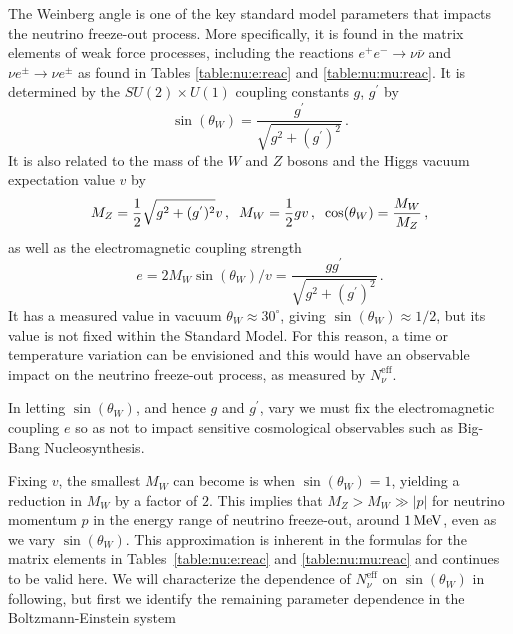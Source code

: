 The Weinberg angle is one of the key standard model parameters that impacts the neutrino freeze-out process. More specifically, it is found in the matrix elements of weak force processes, including the reactions $e^+e^-\rightarrow \nu\bar\nu$ and $\nu e^\pm\rightarrow \nu e^\pm$ as found in Tables \ref{table:nu:e:reac} and \ref{table:nu:mu:reac}. It is determined by the $SU(2)\times U(1)$ coupling constants $g$, $g^{'}$ by
\begin{equation}
\sin(\theta_W)=\frac{g^{'}}{\sqrt{g^2+(g^{'})^2}}\,.
\end{equation}
It is also related to the mass of the $W$ and $Z$ bosons and the Higgs vacuum expectation value $v$ by
\begin{equation}
M_Z=\frac{1}{2}\sqrt{g^2+(g^{'})^2}v\,,\hspace{2mm} M_W=\frac{1}{2}gv\,,\hspace{2mm} \cos(\theta_W)=\frac{M_W}{M_Z}\,,
\end{equation}
as well as the electromagnetic coupling strength
\begin{equation}
e=2M_W\sin(\theta_W)/v=\frac{gg^{'}}{\sqrt{g^2+(g^{'})^2}}\,.
\end{equation}
It has a measured value in vacuum $\theta_W\approx 30^\circ$, giving $\sin(\theta_W)\approx 1/2$, but its value is not fixed within the Standard Model. For this reason, a time or temperature variation can be envisioned and this would have an observable impact on the neutrino freeze-out process, as measured by $N_\nu^{\mathrm{eff}}$.

In letting $\sin(\theta_W)$, and hence $g$ and $g^{'}$, vary we must fix the electromagnetic coupling $e$ so as not to impact sensitive cosmological observables such as Big-Bang Nucleosynthesis. 

Fixing $v$, the smallest $M_W$ can become is when $\sin(\theta_W)=1$, yielding a reduction in $M_W$ by a factor of $2$. This implies that $M_Z>M_W\gg |p|$ for neutrino momentum $p$ in the energy range of neutrino freeze-out, around $1\text{\,MeV}$, even as we vary $\sin(\theta_W)$. This approximation is inherent in the formulas for the matrix elements in Tables~\ref{table:nu:e:reac} and \ref{table:nu:mu:reac} and continues to be valid here. We will characterize the dependence of $N_\nu^{\mathrm{eff}}$ on $\sin(\theta_W)$ in following, but first we identify the remaining parameter dependence in the Boltzmann-Einstein system

